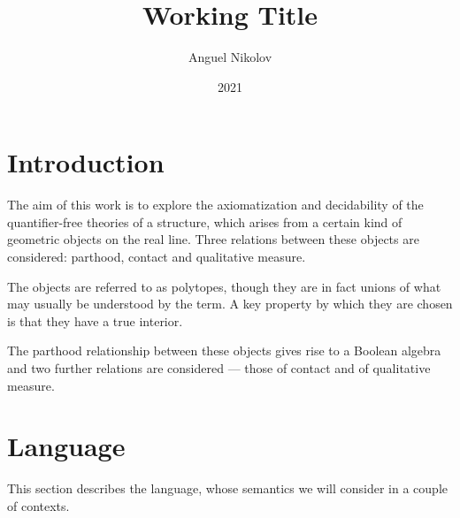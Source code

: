 \documentclass{article}
\title{Working Title}
\author{Anguel Nikolov}
\date{2021}
\begin{document}
\maketitle

\tableofcontents

\section{Introduction}

The aim of this work is to explore the axiomatization and decidability of the quantifier-free theories of a structure, which arises from a certain kind of geometric objects on the real line. Three relations between these objects are considered: parthood, contact and qualitative measure.

The objects are referred to as polytopes, though they are in fact unions of what may usually be understood by the term. A key property by which they are chosen is that they have a true interior.

The parthood relationship between these objects gives rise to a Boolean algebra and two further relations are considered --- those of contact and of qualitative measure.

\section{Language}
This section describes the language, whose semantics we will consider in a couple of contexts.
\end{document}
